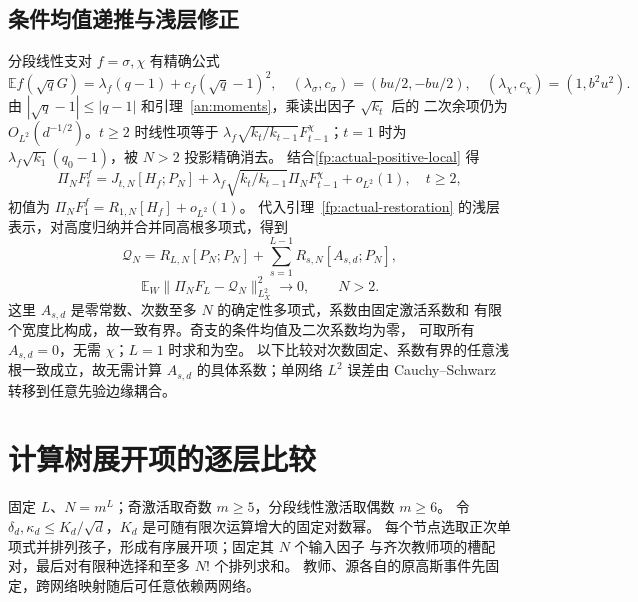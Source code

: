 \documentclass[a4paper]{tufte-handout}
\newcommand{\E}{\mathbb E}
\begin{document}
\begin{fullwidth}
\subsection{条件均值递推与浅层修正}
\label{fp:actual-mean}\label{fp:actual-masked-formula}
分段线性支对 $f=\sigma,\chi$ 有精确公式
\begin{equation}\label{fp:actual-root-mean}
 \E f(\sqrt qG)=\lambda_f(q-1)+c_f(\sqrt q-1)^2,
 \quad (\lambda_\sigma,c_\sigma)=(bu/2,-bu/2),\quad
 (\lambda_\chi,c_\chi)=(1,b^2u^2).
\end{equation}
由 $|\sqrt q-1|\le|q-1|$ 和引理~\ref{an:moments}，乘读出因子 $\sqrt{k_t}$ 后的
二次余项仍为 $O_{L^2}(d^{-1/2})$。$t\ge2$ 时线性项等于
$\lambda_f\sqrt{k_t/k_{t-1}}F_{t-1}^\chi$；$t=1$ 时为
$\lambda_f\sqrt{k_1}(q_0-1)$，被 $N>2$ 投影精确消去。
结合\eqref{fp:actual-positive-local} 得
\begin{equation}\label{fp:actual-cancel-recursion}
 \Pi_NF_t^f=J_{t,N}[H_f;P_N]
 +\lambda_f\sqrt{k_t/k_{t-1}}\Pi_NF_{t-1}^\chi+o_{L^2}(1),
 \quad t\ge2,
\end{equation}
初值为 $\Pi_NF_1^f=R_{1,N}[H_f]+o_{L^2}(1)$。
代入引理~\ref{fp:actual-restoration} 的浅层表示，对高度归纳并合并同高根多项式，得到
\begin{equation}\label{fp:actual-U}
 \mathcal Q_N=R_{L,N}[P_N;P_N]
 +\sum_{s=1}^{L-1}R_{s,N}[A_{s,d};P_N],
\end{equation}
\begin{equation}\label{fp:actual-final}
 \boxed{\E_W\|\Pi_NF_L-\mathcal Q_N\|_{L^2_X}^2\longrightarrow0,\qquad N>2.}
\end{equation}
这里 $A_{s,d}$ 是零常数、次数至多 $N$ 的确定性多项式，系数由固定激活系数和
有限个宽度比构成，故一致有界。奇支的条件均值及二次系数均为零，
可取所有 $A_{s,d}=0$，无需 $\chi$；$L=1$ 时求和为空。
以下比较对次数固定、系数有界的任意浅根一致成立，故无需计算 $A_{s,d}$ 的具体系数；单网络 $L^2$ 误差由
Cauchy--Schwarz 转移到任意先验边缘耦合。


\section{计算树展开项的逐层比较}\label{fp:history}\label{app:cuts}
固定 $L$、$N=m^L$；奇激活取奇数 $m\ge5$，分段线性激活取偶数 $m\ge6$。
令 $\delta_d,\kappa_d\le K_d/\sqrt d$，$K_d$ 是可随有限次运算增大的固定对数幂。
每个节点选取正次单项式并排列孩子，形成有序展开项；固定其 $N$ 个输入因子
与齐次教师项的槽配对，最后对有限种选择和至多 $N!$ 个排列求和。
教师、源各自的原高斯事件先固定，跨网络映射随后可任意依赖两网络。


\end{fullwidth}
\end{document}
